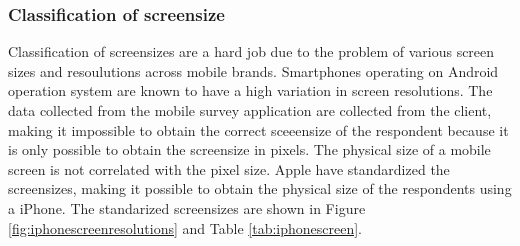     \subsubsection{Classification of screensize}


    Classification of screensizes are a hard job due to the problem of various screen sizes and resoulutions across mobile brands. Smartphones operating on Android operation system are known to have a high variation in screen resolutions. The data collected from the mobile survey application are collected from the client, making it impossible to obtain the correct sceeensize of the respondent because it is only possible to obtain the screensize in pixels. The physical size of a mobile screen is not correlated with the pixel size. Apple have standardized the screensizes, making it possible to obtain the physical size of the respondents using a iPhone. The standarized screensizes are shown in Figure \ref{fig:iphonescreenresolutions} and Table \ref{tab:iphonescreen}.


